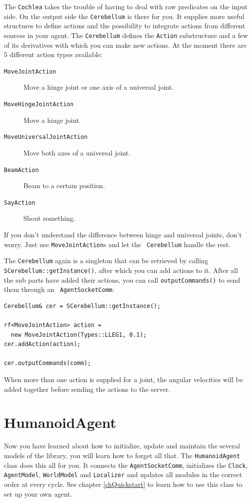The {\tt Cochlea} takes the trouble of having to deal with raw
predicates on the input side. On the output side the {\tt Cerebellum}
is there for you. It supplies more useful structures to define actions
and the possibility to integrate actions from different sources in
your agent. The {\tt Cerebellum} defines the {\tt Action} substructure
and a few of its derivatives with which you can make new actions. At
the moment there are 5 different action types available:
\begin{description}
\item[{\tt MoveJointAction}] Move a hinge joint or one axis of a universal joint.
\item[{\tt MoveHingeJointAction}] Move a hinge joint.
\item[{\tt MoveUniversalJointAction}] Move both axes of a universal joint.
\item[{\tt BeamAction}] Beam to a certain position.
\item[{\tt SayAction}] Shout something.
\end{description}
If you don't understand the difference between hinge and universal
joints, don't worry. Just use {\tt MoveJointAction}s and let the {\tt
  Cerebellum} handle the rest.

The {\tt Cerebellum} again is a singleton that can be retrieved by
calling \\ {\tt SCerebellum::getInstance()}, after which you can add
actions to it. After all the sub parts have added their actions, you
can call {\tt outputCommands()} to send them through an {\tt
  AgentSocketComm}:
\begin{lstlisting}[frame=single]
Cerebellum& cer = SCerebellum::getInstance();

rf<MoveJointAction> action =
  new MoveJointAction(Types::LLEG1, 0.1);
cer.addAction(action);

cer.outputCommands(comm);
\end{lstlisting}
When more than one action is supplied for a joint, the angular
velocities will be added together before sending the actions to the
server.

\section{HumanoidAgent}
\label{secHumanoidAgent}

Now you have learned about how to initialize, update and maintain the
several models of the library, you will learn how to forget all
that. The {\tt HumanoidAgent} class does this all for you. It connects
the {\tt AgentSocketComm}, initializes the {\tt Clock}, {\tt
  AgentModel}, {\tt WorldModel} and {\tt Localizer} and updates all
modules in the correct order at every cycle. See chapter
\ref{chQuickstart} to learn how to use this class to set up your own
agent.


